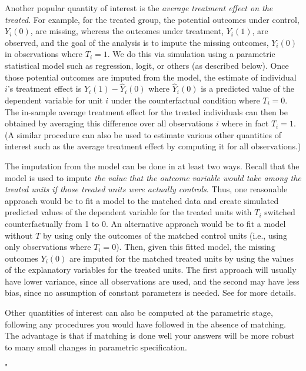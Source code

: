 Another popular quantity of interest is the \emph{average treatment
  effect on the treated}.  For example, for the treated group, the
potential outcomes under control, $Y_i(0)$, are missing, whereas the
outcomes under treatment, $Y_i(1)$, are observed, and the goal of the
analysis is to impute the missing outcomes, $Y_i(0)$ in observations
where $T_i=1$.  We do this via simulation using a parametric
statistical model such as regression, logit, or others (as described
below).  Once those potential outcomes are imputed from the model, the
estimate of individual $i$'s treatment effect is
$Y_i(1)-\widehat{Y}_i(0)$ where $\widehat{Y}_i(0)$ is a predicted
value of the dependent variable for unit $i$ under the counterfactual
condition where $T_i=0$.  The in-sample average treatment effect for
the treated individuals can then be obtained by averaging this
difference over all observations $i$ where in fact $T_i=1$.  (A
similar procedure can also be used to estimate various other
quantities of interest such as the average treatment effect by
computing it for all observations.)

The imputation from the model can be done in at least two ways.
Recall that the model is used to impute \emph{the value that the
  outcome variable would take among the treated units if those treated
  units were actually controls}.  Thus, one reasonable approach would
be to fit a model to the matched data and create simulated predicted
values of the dependent variable for the treated units with $T_i$
switched counterfactually from 1 to 0.  An alternative approach would
be to fit a model without $T$ by using only the outcomes of the
matched control units (i.e., using only observations where $T_i=0$).
Then, given this fitted model, the missing outcomes $Y_i(0)$ are
imputed for the matched treated units by using the values of the
explanatory variables for the treated units.  The first approach will
usually have lower variance, since all observations are used, and the
second may have less bias, since no assumption of constant parameters
is needed.  See \citet*{HoImaKin07} for more details.

Other quantities of interest can also be computed at the parametric
stage, following any procedures you would have followed in the absence
of matching.  The advantage is that if matching is done well your
answers will be more robust to many small changes in parametric
specification.

"
